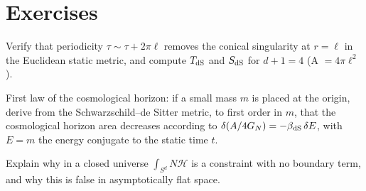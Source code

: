 \section*{Exercises}
\begin{exercise}
Verify that periodicity $\tau\sim\tau+2\pi\ell$ removes the conical singularity at $r=\ell$ in the Euclidean static metric, and compute $T_{\rm dS}$ and $S_{\rm dS}$ for $d+1=4$ (A $=4\pi\ell^2$).
\end{exercise}
\begin{exercise}
First law of the cosmological horizon: if a small mass $m$ is placed at the origin, derive from the Schwarzschild--de Sitter metric, to first order in $m$, that the cosmological horizon area decreases according to $\delta(A/4G_N)=-\beta_{\rm dS}\,\delta E$, with $E=m$ the energy conjugate to the static time $t$.
\end{exercise}
\begin{exercise}
Explain why in a closed universe $\int_{S^d}N\mathcal H$ is a constraint with no boundary term, and why this is false in asymptotically flat space.
\end{exercise}
